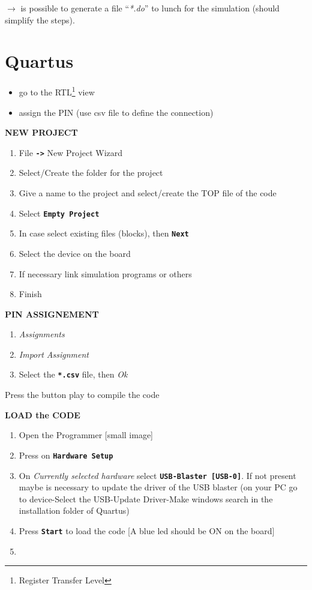 \documentclass[a4paper,10pt,twoside]{article}
\newcommand{\0}{\textbf{0}}
\newcommand{\1}{\textbf{1}}
\newcommand{\code}[1]{{\color{Mulberry}\textbf{\texttt{#1}}}}
\begin{document}
    $\rightarrow$ is possible to generate a file ``\textit{*.do}'' to lunch for the simulation (should simplify the steps).


\section{Quartus}
    \begin{itemize}
        \item go to the RTL\footnote{Register Transfer Level} view
        \item assign the PIN (use csv file to define the connection)
    \end{itemize}

    \textbf{NEW PROJECT}\\
    \begin{enumerate}
        \item File \code{->} New Project Wizard
        \item Select/Create the folder for the project
        \item Give a name to the project and select/create the TOP file of the code
        \item Select \code{Empty Project}
        \item In case select existing files (blocks), then \code{Next}
        \item Select the device on the board
        \item If necessary link simulation programs or others
        \item Finish 
    \end{enumerate}

    \textbf{PIN ASSIGNEMENT}
    \begin{enumerate}
        \item \textit{Assignments}
        \item \textit{Import Assignment}
        \item Select the \code{*.csv} file, then \textit{Ok}
    \end{enumerate}

    Press the button play to compile the code

    \textbf{LOAD the CODE}
    \begin{enumerate}
        \item Open the Programmer [small image]
        \item Press on \code{Hardware Setup}
        \item On \textit{Currently selected hardware} select \code{USB-Blaster [USB-0]}. If not present maybe is necessary to update the driver of the USB blaster (on your PC go to device-Select the USB-Update Driver-Make windows search in the installation folder of Quartus)
        \item Press \code{Start} to load the code [A blue led should be ON on the board]
        \item 
    \end{enumerate}
\end{document}
